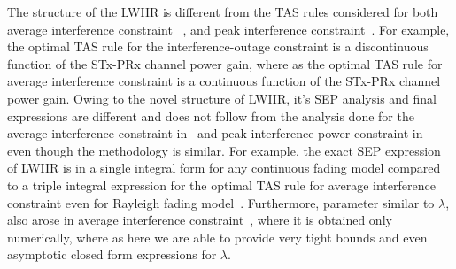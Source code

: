 \documentclass[12pt,draftcls,peerreview,onecolumn]{IEEEtran}
\newcommand{\lam}{\lambda}
\begin{document}
The structure of the LWIIR is different from the TAS rules considered for both average interference constraint ~\cite{Sarvendranath_2013_TCOM,Sarvendranath_2014_TCOM,Wang_2011_TCom}, and peak interference constraint~\cite{Hanif_2015_globecom,Wang_2010_TWC}. For example, the optimal TAS rule for the interference-outage constraint is a discontinuous function of the STx-PRx channel power gain, where as the optimal TAS rule for average interference constraint is a continuous function of the STx-PRx channel power gain. Owing to the novel structure of LWIIR, it's SEP analysis and final expressions are different and does not follow from the analysis done for the average interference constraint in~\cite{Sarvendranath_2013_TCOM} and peak interference power constraint in~\cite{Fakhan_2014_TSP} even though the methodology is similar. For example, the exact SEP expression of LWIIR is in a single integral form for any continuous fading model compared to a triple integral expression for the optimal TAS rule for average interference constraint even for Rayleigh fading model~\cite{Sarvendranath_2013_TCOM}. Furthermore, parameter similar to $\lam$, also arose in average interference constraint~\cite{Sarvendranath_2013_TCOM,Sarvendranath_2014_TCOM,Wang_2011_TCom}, where it is obtained only numerically, where as here we are able to provide very tight bounds and even asymptotic closed form expressions for $\lam$.


\end{document}
